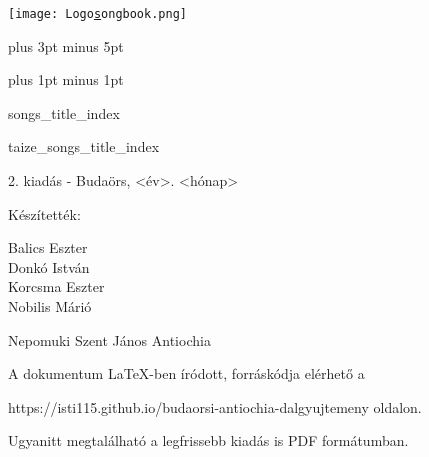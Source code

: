 \documentclass[a5paper,twoside]{article}
\renewcommand{\_}[1]{\underline{#1}}
\begin{document}
  \begin{titlepage}
    \thispagestyle{empty}

    \vspace*{1.3cm}
    \texttt{[image: Logo\_songbook.png]}

  \end{titlepage}

  \renewcommand{\idxtitlefont}{\sffamily}
  \renewcommand{\idxlyricfont}{\rmfamily\slshape}

  \versesep=12pt plus 3pt minus 5pt

  \iflyric
    \baselineadj=2pt plus 1pt minus 1pt
  \fi

  \begin{songs}{songs_title_index}
    
    
  \end{songs}

  \begin{songs}{taize_songs_title_index}
    
  \end{songs}

  \begin{songs}{}
    
  \end{songs}

  \begin{songs}{}
    
  \end{songs}

  \ifthenelse{\isodd{\value{page}}}{
    \newpage
    \thispagestyle{empty}
    \null
  }{}

  \newpage
  \thispagestyle{empty}

  \vspace*{\fill}
  \setlength{\parindent}{0pt}

  2. kiadás - Budaörs, <év>. <hónap>

  \vspace{0.3cm}

  Készítették:
  \vspace{-0.3cm}
  \begin{multicols}{3}
    Balics Eszter \\
    Donkó István \\
    Korcsma Eszter \\
    Nobilis Márió \\
  \end{multicols}

  Nepomuki Szent János Antiochia

  \vspace{0.3cm}

  A dokumentum LaTeX-ben íródott, forráskódja elérhető a

  https://isti115.github.io/budaorsi-antiochia-dalgyujtemeny oldalon.

  Ugyanitt megtalálható a legfrissebb kiadás is PDF formátumban.
\end{document}
